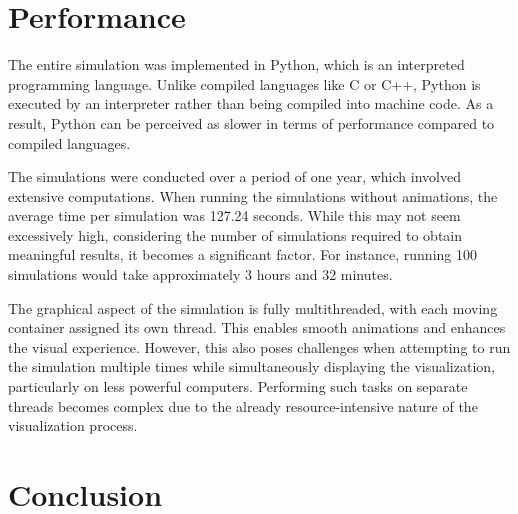 \documentclass{article}
\begin{document}
\section{Performance}\label{sec:performance}

The entire simulation was implemented in Python, which is an interpreted
programming language. Unlike compiled languages like C or C++, Python is
executed by an interpreter rather than being compiled into machine code. As a
result, Python can be perceived as slower in terms of performance compared to
compiled languages.

The simulations were conducted over a period of one year, which involved
extensive computations. When running the simulations without animations, the
average time per simulation was 127.24 seconds. While this may not seem
excessively high, considering the number of simulations required to obtain
meaningful results, it becomes a significant factor. For instance, running 100
simulations would take approximately 3 hours and 32 minutes.

The graphical aspect of the simulation is fully multithreaded, with each moving
container assigned its own thread. This enables smooth animations and enhances
the visual experience. However, this also poses challenges when attempting to
run the simulation multiple times while simultaneously displaying the
visualization, particularly on less powerful computers. Performing such tasks
on separate threads becomes complex due to the already resource-intensive
nature of the visualization process.

\section{Conclusion}
\end{document}
